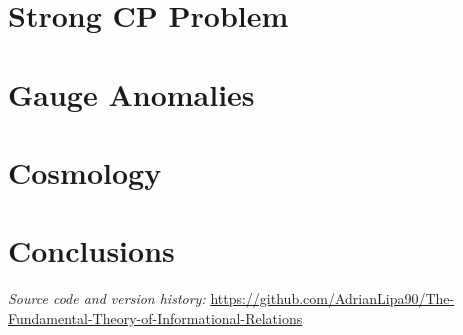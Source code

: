 \documentclass[11pt,a4paper,twoside]{book}
\theoremstyle{definition}
\begin{document}
\part{Strong CP Problem}


\part{Gauge Anomalies}


\part{Cosmology}

\part{Conclusions}




\appendix


















\vfill
\noindent\small\textit{Source code and version history:}
\url{https://github.com/AdrianLipa90/The-Fundamental-Theory-of-Informational-Relations}
\par\vspace{2cm}
\backmatter
\printindex
\end{document}
